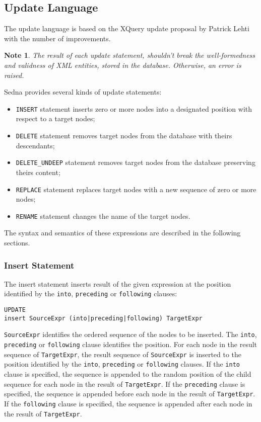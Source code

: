 \documentclass[a4paper,12pt]{article}
\newtheorem{note}{Note}    %
\newenvironment{citemize}
{\begin{itemize}
  \setlength{\itemsep}{0pt}
  \setlength{\parskip}{0pt}
  \setlength{\parsep}{0pt}}
{\end{itemize}}
\begin{document}
\subsection{Update Language}
\label{upd-lang}

The update language is based on the XQuery update proposal by Patrick Lehti
\cite{paper:query-update} with the number of improvements.

\begin{note}
The result of each update statement, shouldn't break the well-formedness and
validness of XML entities, stored in the database. Otherwise, an error is
raised.
\end{note}

Sedna provides several kinds of update statements:
\begin{citemize}
\item\verb!INSERT! statement inserts zero or more nodes into a designated
position with respect to a target nodes;
\item\verb!DELETE! statement removes target nodes from the database with theirs
descendants;
\item\verb!DELETE_UNDEEP! statement removes target nodes from the database
preserving theirs content;
\item\verb!REPLACE! statement replaces target nodes with a new sequence of zero
or more nodes;
\item\verb!RENAME! statement changes the name of the target nodes.
\end{citemize}
The syntax and semantics of these expressions are described in the following
sections.


\subsubsection*{Insert Statement}
The insert statement inserts result of the given expression at the position
identified by the \verb!into!, \verb!preceding! or \verb!following! clauses:

\begin{verbatim}
UPDATE
insert SourceExpr (into|preceding|following) TargetExpr
\end{verbatim}
\verb!SourceExpr! identifies the ordered sequence of the nodes to be inserted.
The \verb!into!, \verb!preceding! or \verb!following! clause identifies the
position. For each node in the result sequence of \verb!TargetExpr!, the result
sequence of \verb!SourceExpr! is inserted to the position identified by the
\verb!into!, \verb!preceding! or \verb!following! clauses. If the \verb!into!
clause is specified, the sequence is appended to the random position of the
child sequence for each node in the result of \verb!TargetExpr!. If the
\verb!preceding! clause is specified, the sequence is appended before each node
in the result of \verb!TargetExpr!. If the \verb!following! clause is specified,
the sequence is appended after each node in the result of \verb!TargetExpr!.
\end{document}
